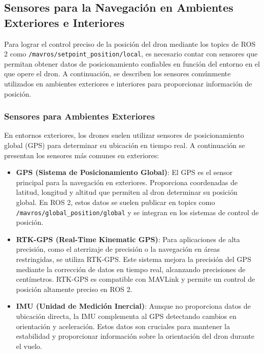     
\subsection{Sensores para la Navegación en Ambientes Exteriores e Interiores}
    Para lograr el control preciso de la posición del dron mediante los topics de ROS 2 como \texttt{/mavros/setpoint\_position/local}, es necesario contar con sensores que permitan obtener datos de posicionamiento confiables en función del entorno en el que opere el dron. A continuación, se describen los sensores comúnmente utilizados en ambientes exteriores e interiores para proporcionar información de posición.
    
    \subsubsection{Sensores para Ambientes Exteriores}
    En entornos exteriores, los drones suelen utilizar sensores de posicionamiento global (GPS) para determinar su ubicación en tiempo real. A continuación se presentan los sensores más comunes en exteriores:
        \begin{itemize}
            \item \textbf{GPS (Sistema de Posicionamiento Global)}: El GPS es el sensor principal para la navegación en exteriores. Proporciona coordenadas de latitud, longitud y altitud que permiten al dron determinar su posición global. En ROS 2, estos datos se suelen publicar en topics como \texttt{/mavros/global\_position/global} y se integran en los sistemas de control de posición.
            
            \item \textbf{RTK-GPS (Real-Time Kinematic GPS)}: Para aplicaciones de alta precisión, como el aterrizaje de precisión o la navegación en áreas restringidas, se utiliza RTK-GPS. Este sistema mejora la precisión del GPS mediante la corrección de datos en tiempo real, alcanzando precisiones de centímetros. RTK-GPS es compatible con MAVLink y permite un control de posición altamente preciso en ROS 2.
            
            \item \textbf{IMU (Unidad de Medición Inercial)}: Aunque no proporciona datos de ubicación directa, la IMU complementa al GPS detectando cambios en orientación y aceleración. Estos datos son cruciales para mantener la estabilidad y proporcionar información sobre la orientación del dron durante el vuelo.
        \end{itemize}
    
